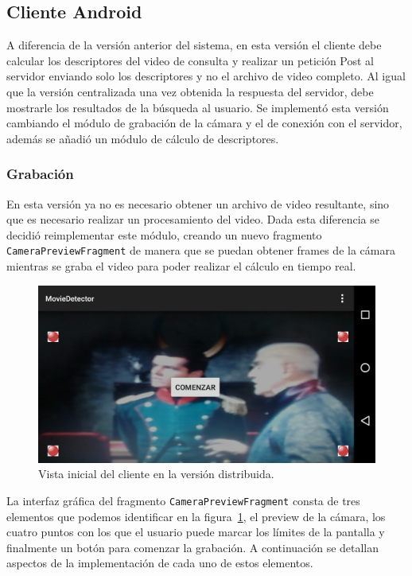 \subsection{Cliente Android}
A diferencia de la versión anterior del sistema, en esta versión el cliente debe calcular los descriptores del video de consulta y realizar un petición Post al servidor enviando solo los descriptores y no el archivo de video completo. Al igual que la versión centralizada una vez obtenida la respuesta del servidor, debe mostrarle los resultados de la búsqueda al usuario. Se implementó esta versión cambiando el módulo de grabación de la cámara y el de conexión con el servidor, además se añadió un módulo de cálculo de descriptores.

\subsubsection*{Grabación}
En esta versión ya no es necesario obtener un archivo de video resultante, sino que es necesario realizar un procesamiento del video. Dada esta diferencia se decidió reimplementar este módulo, creando un nuevo fragmento \texttt{CameraPreviewFragment} de manera que se puedan obtener frames de la cámara mientras se graba el video para poder realizar el cálculo en tiempo real.
	\begin{figure}[!h]
		\centering
		\includegraphics[scale=0.3]{imagenes/cap4/pantalla_inicial_distribuida.png}
		\caption{Vista inicial del cliente en la versión distribuida.}
		\label{pantalla_inicial_distribuida}
	\end{figure}
La interfaz gráfica del fragmento \texttt{CameraPreviewFragment} consta de tres elementos que podemos identificar en la figura~\ref{pantalla_inicial_distribuida}, el preview de la cámara, los cuatro puntos con los que el usuario puede marcar los límites de la pantalla y finalmente un botón para comenzar la grabación. A continuación se detallan aspectos de la implementación de cada uno de estos elementos.

